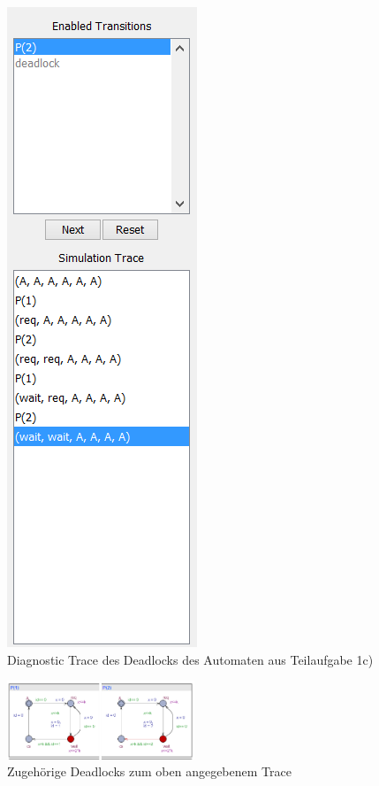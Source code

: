 \begin{figure}[H] 
	\centering 
	\includegraphics[height=0.4\textheight]{./UPAAAL_Screens/Aufgabe1d_Trace}
	\caption[Aufgabe 1d)]{Diagnostic Trace des Deadlocks des Automaten aus Teilaufgabe 1c)}    
\end{figure}

\begin{figure}[H] 
	\centering 
	\includegraphics[width=0.5\textwidth]{./UPAAAL_Screens/Aufgabe1d_TraceGraph}
	\caption[Aufgabe 1d)]{Zugehörige Deadlocks zum oben angegebenem Trace}    
\end{figure}
